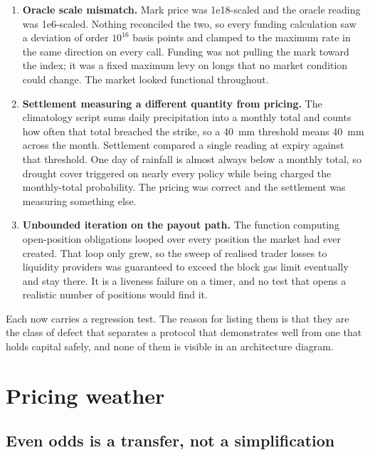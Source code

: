 \documentclass[11pt,a4paper]{article}
\begin{document}
\begin{enumerate}[leftmargin=1.4em, itemsep=3pt]
\item \textbf{Oracle scale mismatch.} Mark price was 1e18-scaled and the oracle reading was
1e6-scaled. Nothing reconciled the two, so every funding calculation saw a deviation of
order $10^{16}$ basis points and clamped to the maximum rate in the same direction on every
call. Funding was not pulling the mark toward the index; it was a fixed maximum levy on
longs that no market condition could change. The market looked functional throughout.

\item \textbf{Settlement measuring a different quantity from pricing.} The climatology script
sums daily precipitation into a monthly total and counts how often that total breached the
strike, so a 40~mm threshold means 40~mm across the month. Settlement compared a single
reading at expiry against that threshold. One day of rainfall is almost always below a
monthly total, so drought cover triggered on nearly every policy while being charged the
monthly-total probability. The pricing was correct and the settlement was measuring
something else.

\item \textbf{Unbounded iteration on the payout path.} The function computing open-position
obligations looped over every position the market had ever created. That loop only grew, so
the sweep of realised trader losses to liquidity providers was guaranteed to exceed the block
gas limit eventually and stay there. It is a liveness failure on a timer, and no test that
opens a realistic number of positions would find it.
\end{enumerate}

Each now carries a regression test. The reason for listing them is that they are the class
of defect that separates a protocol that demonstrates well from one that holds capital
safely, and none of them is visible in an architecture diagram.

\section{Pricing weather}
\label{sec:pricing}

\subsection{Even odds is a transfer, not a simplification}
\end{document}
